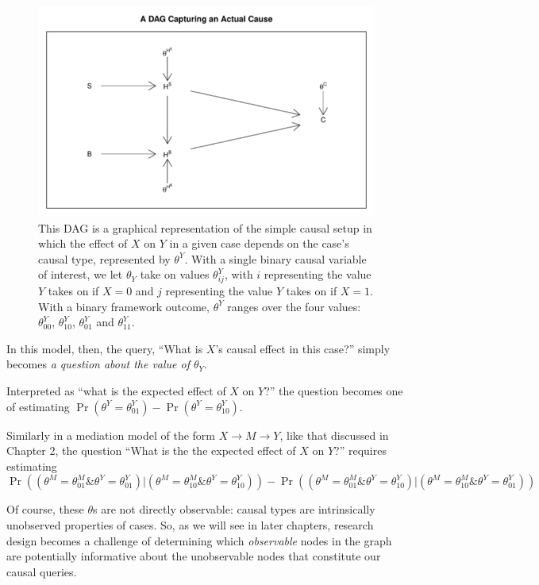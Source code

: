 \documentclass[12pt,]{book}
\begin{document}
\begin{figure}

{\centering \includegraphics[width=.5\textwidth]{ii_files/figure-latex/unnamed-chunk-14-1} 

}

\caption{\label{fig:casequery} This DAG is a graphical representation of the simple causal setup in which the effect of $X$ on $Y$ in a given case depends on the case's causal type, represented by $\theta^Y$. With a single binary causal variable of interest, we let $\theta_Y$ take on values $\theta^Y_{ij}$, with $i$ representing the value $Y$ takes on if $X=0$ and $j$ representing the value $Y$ takes on if $X=1$. With a binary framework outcome, $\theta^Y$ ranges over the four values: $\theta^Y_{00}$, $\theta^Y_{10}$, $\theta^Y_{01}$ and $\theta^Y_{11}$.}\label{fig:unnamed-chunk-14}
\end{figure}

In this model, then, the query, ``What is \(X\)'s causal effect in this case?'' simply becomes \emph{a question about the value of \(\theta_Y\)}.

Interpreted as ``what is the expected effect of \(X\) on \(Y\)?'' the question becomes one of estimating \(\Pr(\theta^Y = \theta^Y_{01}) - \Pr(\theta^Y = \theta^Y_{10})\).

Similarly in a mediation model of the form \(X\rightarrow M \rightarrow Y\), like that discussed in Chapter 2, the question ``What is the the expected effect of \(X\) on \(Y\)?'' requires estimating
\[\Pr((\theta^M = \theta^M_{01} \& \theta^Y = \theta^Y_{01}) | (\theta^M = \theta^M_{10} \& \theta^Y = \theta^Y_{10}))   - \Pr((\theta^M = \theta^M_{01} \& \theta^Y = \theta^Y_{10}) | (\theta^M = \theta^M_{10} \& \theta^Y = \theta^Y_{01}))\]

Of course, these \(\theta\)s are not directly observable: causal types are intrinsically unobserved properties of cases. So, as we will see in later chapters, research design becomes a challenge of determining which \emph{observable} nodes in the graph are potentially informative about the unobservable nodes that constitute our causal queries.
\end{document}
